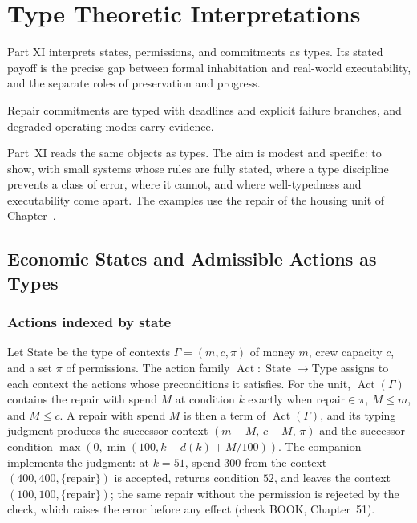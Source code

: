 \part{Type Theoretic Interpretations}
\label{part:XI}

Part XI interprets states, permissions, and commitments as types. Its stated payoff is the precise gap between formal inhabitation and real-world executability, and the separate roles of preservation and progress.

\begin{housing}Repair commitments are typed with deadlines and explicit failure branches, and degraded operating modes carry evidence.\end{housing}


Part~XI reads the same objects as types. The aim is modest and specific: to show, with small systems whose rules are fully stated, where a type discipline prevents a class of error, where it cannot, and where well-typedness and executability come apart. The examples use the repair of the housing unit of Chapter~.

\chapter{Economic States and Admissible Actions as Types}\label{ch:51}

\section{Actions indexed by state}

Let $\mathrm{State}$ be the type of contexts $\Gamma=(m,c,\pi)$ of money $m$, crew capacity $c$, and a set $\pi$ of permissions. The action family $\operatorname{Act}:\operatorname{State}\to\mathrm{Type}$ assigns to each context the actions whose preconditions it satisfies. For the unit, $\operatorname{Act}(\Gamma)$ contains the repair with spend $M$ at condition $k$ exactly when $\mathrm{repair}\in\pi$, $M\le m$, and $M\le c$. A repair with spend $M$ is then a term of $\operatorname{Act}(\Gamma)$, and its typing judgment produces the successor context $(m-M,\,c-M,\,\pi)$ and the successor condition $\max(0,\min(100,k-d(k)+M/100))$. The companion implements the judgment: at $k=51$, spend $300$ from the context $(400,400,\{\mathrm{repair}\})$ is accepted, returns condition $52$, and leaves the context $(100,100,\{\mathrm{repair}\})$; the same repair without the permission is rejected by the check, which raises the error before any effect (check BOOK, Chapter~51).

